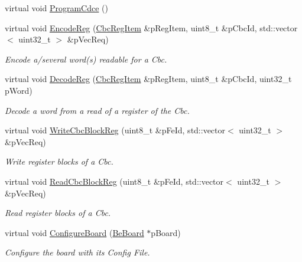 \begin{DoxyCompactItemize}
\item 
virtual void \hyperlink{class_ph2___hw_interface_1_1_be_board_f_w_interface_a9575de192b6dd5613857ce255ec6947b}{Program\-Cdce} ()
\item 
virtual void \hyperlink{class_ph2___hw_interface_1_1_be_board_f_w_interface_a11f16d760d3e3df44daec200ac8d4275}{Encode\-Reg} (\hyperlink{struct_ph2___hw_description_1_1_cbc_reg_item}{Cbc\-Reg\-Item} \&p\-Reg\-Item, uint8\-\_\-t \&p\-Cbc\-Id, std\-::vector$<$ uint32\-\_\-t $>$ \&p\-Vec\-Req)
\begin{DoxyCompactList}\small\item\em Encode a/several word(s) readable for a Cbc. \end{DoxyCompactList}\item 
virtual void \hyperlink{class_ph2___hw_interface_1_1_be_board_f_w_interface_a31041cc7eee33af5663c035b88f5749c}{Decode\-Reg} (\hyperlink{struct_ph2___hw_description_1_1_cbc_reg_item}{Cbc\-Reg\-Item} \&p\-Reg\-Item, uint8\-\_\-t \&p\-Cbc\-Id, uint32\-\_\-t p\-Word)
\begin{DoxyCompactList}\small\item\em Decode a word from a read of a register of the Cbc. \end{DoxyCompactList}\item 
virtual void \hyperlink{class_ph2___hw_interface_1_1_be_board_f_w_interface_abfda233c55aaa85fcd3773fa424764d5}{Write\-Cbc\-Block\-Reg} (uint8\-\_\-t \&p\-Fe\-Id, std\-::vector$<$ uint32\-\_\-t $>$ \&p\-Vec\-Req)
\begin{DoxyCompactList}\small\item\em Write register blocks of a Cbc. \end{DoxyCompactList}\item 
virtual void \hyperlink{class_ph2___hw_interface_1_1_be_board_f_w_interface_aef5cfbb0b5adceff7ccc6babd3d01642}{Read\-Cbc\-Block\-Reg} (uint8\-\_\-t \&p\-Fe\-Id, std\-::vector$<$ uint32\-\_\-t $>$ \&p\-Vec\-Req)
\begin{DoxyCompactList}\small\item\em Read register blocks of a Cbc. \end{DoxyCompactList}\item 
virtual void \hyperlink{class_ph2___hw_interface_1_1_be_board_f_w_interface_a2507c664f19d1d5e3f6de69da16365e8}{Configure\-Board} (\hyperlink{class_ph2___hw_description_1_1_be_board}{Be\-Board} $\ast$p\-Board)
\begin{DoxyCompactList}\small\item\em Configure the board with its Config File. \end{DoxyCompactList}\item 

\end{DoxyCompactItemize}
